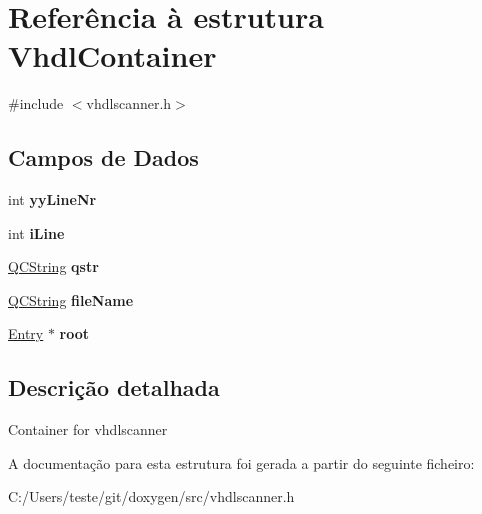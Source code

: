 \hypertarget{struct_vhdl_container}{\section{Referência à estrutura Vhdl\-Container}
\label{struct_vhdl_container}
}


{\ttfamily \#include $<$vhdlscanner.\-h$>$}

\subsection*{Campos de Dados}
\begin{DoxyCompactItemize}
\item 
\hypertarget{struct_vhdl_container_a7055c333a0f6debac7ceba2847dc0dbf}{int {\bfseries yy\-Line\-Nr}}\label{struct_vhdl_container_a7055c333a0f6debac7ceba2847dc0dbf}

\item 
\hypertarget{struct_vhdl_container_a4d2517b7d0e2a89bf8f679590bb60c13}{int {\bfseries i\-Line}}\label{struct_vhdl_container_a4d2517b7d0e2a89bf8f679590bb60c13}

\item 
\hypertarget{struct_vhdl_container_ab6d072560ee1d8c52cc05c46a3cf3120}{\hyperlink{class_q_c_string}{Q\-C\-String} {\bfseries qstr}}\label{struct_vhdl_container_ab6d072560ee1d8c52cc05c46a3cf3120}

\item 
\hypertarget{struct_vhdl_container_abb9cd3e430c4eaf05aa259fa96f32305}{\hyperlink{class_q_c_string}{Q\-C\-String} {\bfseries file\-Name}}\label{struct_vhdl_container_abb9cd3e430c4eaf05aa259fa96f32305}

\item 
\hypertarget{struct_vhdl_container_a88ddd74584f59814dbeec46cadf7b705}{\hyperlink{class_entry}{Entry} $\ast$ {\bfseries root}}\label{struct_vhdl_container_a88ddd74584f59814dbeec46cadf7b705}

\end{DoxyCompactItemize}


\subsection{Descrição detalhada}
Container for vhdlscanner 

A documentação para esta estrutura foi gerada a partir do seguinte ficheiro\-:\begin{DoxyCompactItemize}
\item 
C\-:/\-Users/teste/git/doxygen/src/vhdlscanner.\-h\end{DoxyCompactItemize}
